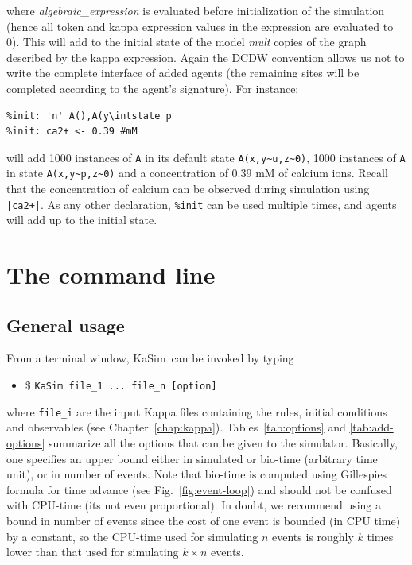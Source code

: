 \documentclass[11pt]{book}
\def\KaSim{\textsf{KaSim}}
\def\intstate{\textasciitilde}
\def\ttt#1{\texttt{#1}}
\def\ITE#1{\begin{itemize}#1\end{itemize}}
\begin{document}
where \textit{algebraic\_expression} is evaluated before initialization of the simulation (hence all token and kappa expression values in the expression are evaluated to 0). This will add to the initial state of the model \textit{mult} copies of the graph described by the kappa expression. Again the DCDW convention allows us not to write the complete interface of added agents (the remaining sites will be completed according to the agent's signature). For instance:
\begin{lstlisting}[language=kappa]
%var: 'n' 1000
%init: 'n' A(),A(y\intstate p
%init: ca2+ <- 0.39 #mM
\end{lstlisting}
will add 1000 instances of \ttt{A} in its default state \ttt{A(x,y\intstate u,z\intstate 0)}, 1000 instances of \ttt{A} in state \ttt{A(x,y\intstate p,z\intstate 0)} and a concentration of 0.39 mM of calcium ions. Recall that the concentration of calcium can be observed during simulation using \ttt{|ca2+|}.
As any other declaration, \ttt{\%init} can be used multiple times, and agents will add up to the initial state.


\chapter{The command line}\label{chap:cl}

\section{General usage}
From a terminal window, \KaSim~can be invoked by typing 
\ITE{
\item[\$] \ttt{KaSim file\_1 ... file\_n [option] }
}
where \ttt{file\_i} are the input Kappa files containing the rules, initial conditions and observables (see Chapter~\ref{chap:kappa}). Tables~\ref{tab:options} and \ref{tab:add-options} summarize all the options that can be given to the simulator. Basically, one specifies an upper bound either in simulated or bio-time (arbitrary time unit), or in number of events. Note that bio-time is computed using Gillespie{\textquotesingle}s formula for time advance (see Fig.~\ref{fig:event-loop}) and should not be confused with CPU-time (it{\textquotesingle}s not even proportional). In doubt, we recommend using a bound in number of events since the cost of one event is bounded (in CPU time) by a constant, so the CPU-time used for simulating $n$ events is roughly $k$ times lower than that used for simulating $k\times n$ events.
\end{document}
